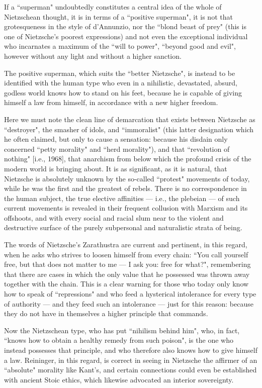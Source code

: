 If a ``superman" undoubtedly constitutes a central idea of the whole of Nietzschean thought, it is in terms of a ``positive superman", it is not that grotesqueness in the style of d'Annunzio, nor the ``blond beast of prey" (this is one of Nietzsche's poorest expressions) and not even the exceptional individual who incarnates a maximum of the ``will to power", ``beyond good and evil", however without any light and without a higher sanction.

The positive superman, which suits the ``better Nietzsche", is instead to be identified with the human type who even in a nihilistic, devastated, absurd, godless world knows how to stand on his feet, because he is capable of giving himself a law from himself, in accordance with a new higher freedom.

Here we must note the clean line of demarcation that exists between Nietzsche as ``destroyer", the smasher of idols, and ``immoralist" (this latter designation which he often claimed, but only to cause a sensation: because his disdain only concerned ``petty morality" and ``herd morality"), and that ``revolution of nothing" [i.e., 1968], that anarchism from below which the profound crisis of the modern world is bringing about. It is as significant, as it is natural, that Nietzsche is absolutely unknown by the so-called ``protest" movements of today, while he was the first and the greatest of rebels. There is no correspondence in the human subject, the true elective affinities — i.e., the plebeian — of such current movements is revealed in their frequent collusion with Marxism and its offshoots, and with every social and racial slum near to the violent and destructive surface of the purely subpersonal and naturalistic strata of being.

The words of Nietzsche's Zarathustra are current and pertinent, in this regard, when he asks who strives to loosen himself from every chain: ``You call yourself free, but that does not matter to me — I ask you: free for what?", remembering that there are cases in which the only value that he possessed was thrown away together with the chain. This is a clear warning for those who today only know how to speak of ``repressions" and who feed a hysterical intolerance for every type of authority — and they feed such an intolerance — just for this reason: because they do not have in themselves a higher principle that commands.

Now the Nietzschean type, who has put ``nihilism behind him", who, in fact, ``knows how to obtain a healthy remedy from such poison", is the one who instead possesses that principle, and who therefore also knows how to give himself a law. Reininger, in this regard, is correct in seeing in Nietzsche the affirmer of an ``absolute" morality like Kant's, and certain connections could even be established with ancient Stoic ethics, which likewise advocated an interior sovereignty.

